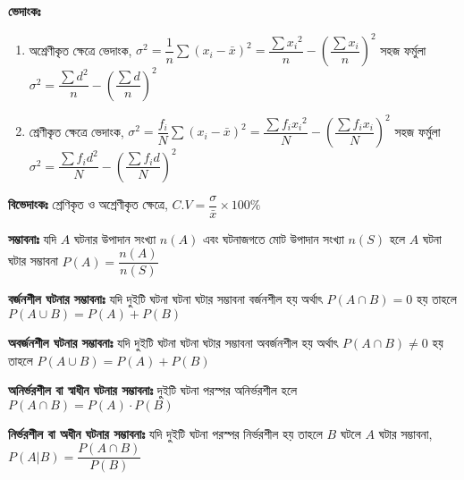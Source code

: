 \documentclass[a4paper,12pt]{article}
\newcommand{\dd}{\displaystyle}
\begin{document}
\textbf{ভেদাংকঃ}
\begin{enumerate}
    \item অশ্রেণীকৃত ক্ষেত্রে ভেদাংক, $\dd \sigma^2 = \dfrac{1}{n} \sum (x_i-\bar{x})^2 = \dfrac{\sum {x_i}^2}{n}-\left(\dfrac{\sum x_i}{n} \right)^2$ সহজ ফর্মুলা $\dd \sigma^2 = \dfrac{\sum d^2}{n}-\left(\dfrac{\sum d}{n} \right)^2$
    \item শ্রেণীকৃত ক্ষেত্রে ভেদাংক, $\dd \sigma^2 = \dfrac{f_i}{N} \sum (x_i-\bar{x})^2 = \dfrac{\sum f_i {x_i}^2}{N}-\left(\dfrac{\sum f_i x_i}{N} \right)^2$ সহজ ফর্মুলা $\dd \sigma^2 = \dfrac{\sum f_id^2}{N}-\left(\dfrac{\sum f_i d}{N} \right)^2$
\end{enumerate}

\textbf{বিভেদাংকঃ} শ্রেণিকৃত ও অশ্রেণীকৃত ক্ষেত্রে, $C.V = \dfrac{\sigma}{\bar{x}}\times 100\%$

\textbf{সম্ভাবনাঃ} যদি $A$ ঘটনার উপাদান সংখ্যা $n(A)$ এবং ঘটনাজগতে মোট উপাদান সংখ্যা $n(S)$ হলে $A$ ঘটনা ঘটার সম্ভাবনা $P(A)=\dfrac{n(A)}{n(S)}$

\textbf{বর্জনশীল ঘটনার সম্ভাবনাঃ} যদি দুইটি ঘটনা ঘটনা ঘটার সম্ভাবনা বর্জনশীল হয় অর্থাৎ $P(A \cap B)=0$ হয় তাহলে $P(A\cup B)= P(A)+P(B)$

\textbf{অবর্জনশীল ঘটনার সম্ভাবনাঃ} যদি দুইটি ঘটনা ঘটনা ঘটার সম্ভাবনা অবর্জনশীল হয় অর্থাৎ $P(A \cap B) \neq 0$ হয় তাহলে $P(A\cup B)= P(A)+P(B)$

\textbf{অনির্ভরশীল বা স্বাধীন ঘটনার সম্ভাবনাঃ} দুইটি ঘটনা পরস্পর অনির্ভরশীল হলে $P(A \cap B) = P(A)\cdot P(B)$

\textbf{নির্ভরশীল বা অধীন ঘটনার সম্ভাবনাঃ} যদি দুইটি ঘটনা পরস্পর নির্ভরশীল হয় তাহলে $B$ ঘটলে $A$ ঘটার সম্ভাবনা, $P(A|B)=\dfrac{P(A \cap B)}{P(B)}$
\end{document}
